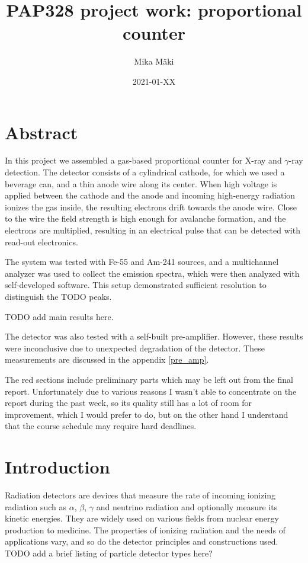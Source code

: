 \documentclass[a4paper]{article}
\title{PAP328 project work: proportional counter}
\author{Mika Mäki}
\date{2021-01-XX}
\newenvironment{todo}{
\color{red}
}
{
}
\begin{document}
\maketitle

\section*{Abstract}
In this project we assembled a gas-based proportional counter for X-ray and $\gamma$-ray detection.
The detector consists of a cylindrical cathode, for which we used a beverage can, and a thin anode wire along its center.
When high voltage is applied between the cathode and the anode and incoming high-energy radiation ionizes the gas inside, the resulting electrons drift towards the anode wire.
Close to the wire the field strength is high enough for avalanche formation, and the electrons are multiplied, resulting in an electrical pulse that can be detected with read-out electronics.

The system was tested with Fe-55 and Am-241 sources, and a multichannel analyzer was used to collect the emission spectra, which were then analyzed with self-developed software.
This setup demonstrated sufficient resolution to distinguish the TODO peaks.

TODO add main results here.

The detector was also tested with a self-built pre-amplifier.
However, these results were inconclusive due to unexpected degradation of the detector.
These measurements are discussed in the appendix \ref{pre_amp}.

\begin{todo}
The red sections include preliminary parts which may be left out from the final report.
Unfortunately due to various reasons I wasn't able to concentrate on the report during the past week, so its quality still has a lot of room for improvement, which I would prefer to do, but on the other hand I understand that the course schedule may require hard deadlines.
\end{todo}

\tableofcontents


\section{Introduction}
\label{introduction}
Radiation detectors are devices that measure the rate of incoming ionizing radiation such as $\alpha$, $\beta$, $\gamma$ and neutrino radiation and optionally measure its kinetic energies.
They are widely used on various fields from nuclear energy production to medicine.
The properties of ionizing radiation and the needs of applications vary, and so do the detector principles and constructions used.
TODO add a brief listing of particle detector types here?
\end{document}
